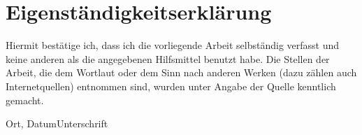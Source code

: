 \chapter*{Eigenständigkeitserklärung}

Hiermit bestätige ich, dass ich die vorliegende Arbeit selbständig verfasst und keine
anderen als die angegebenen Hilfsmittel benutzt habe. Die Stellen der Arbeit, die dem Wortlaut oder dem Sinn nach anderen Werken (dazu zählen auch Internetquellen) entnommen sind, wurden unter Angabe der Quelle kenntlich gemacht.
\newline

\hrulefill \hfill \hrulefill

Ort, Datum\hfill Unterschrift

\newpage
